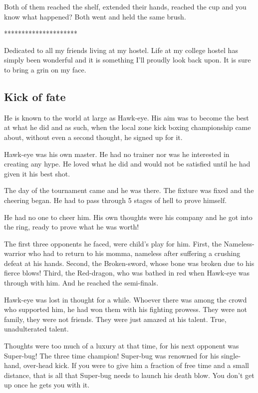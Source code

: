 \documentclass[twoside,11pt,titlepage]{article}
\begin{document}
Both of them reached the shelf, extended their hands, reached the cup and you know what happened? Both went and held the same brush.

\bigskip
\begin{center}
*********************
\end{center}

Dedicated to all my friends living at my hostel. Life at my college hostel has simply been wonderful and it is something I'll proudly look back upon. It is sure to bring a grin on my face.


\newpage
\begin{center}
  \section{Kick of fate}
\end{center}
\bigskip
\bigskip
\bigskip

He is known to the world at large as Hawk-eye. His aim was to become the best at what he did and as such, when the local zone kick boxing championship came about, without even a second thought, he signed up for it.

Hawk-eye was his own master. He had no trainer nor was he interested in creating any hype. He loved what he did and would not be satisfied until he had given it his best shot.

The day of the tournament came and he was there. The fixture was fixed and the cheering began. He had to pass through 5 stages of hell to prove himself.

He had no one to cheer him. His own thoughts were his company and he got into the ring, ready to prove what he was worth!

The first three opponents he faced, were child's play for him. First, the Nameless-warrior who had to return to his momma, nameless after suffering a crushing defeat at his hands. Second, the Broken-sword, whose bone was broken due to his fierce blows! Third, the Red-dragon, who was bathed in red when Hawk-eye was through with him. And he reached the semi-finals.

Hawk-eye was lost in thought for a while. Whoever there was among the crowd who supported him, he had won them with his fighting prowess. They were not family, they were not friends. They were just amazed at his talent. True, unadulterated talent.

Thoughts were too much of a luxury at that time, for his next opponent was Super-bug! The three time champion! Super-bug was renowned for his single-hand, over-head kick. If you were to give him a fraction of free time and a small distance, that is all that Super-bug needs to launch his death blow. You don't get up once he gets you with it.
\end{document}

